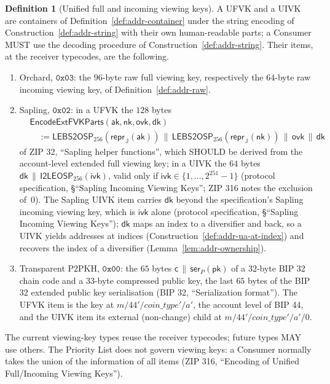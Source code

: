 \documentclass[11pt,a4paper]{article}
\theoremstyle{definition}
\newtheorem{definition}[theorem]{Definition}
\newcommand{\aksym}{\ensuremath{\mathsf{ak}}}
\newcommand{\nksym}{\ensuremath{\mathsf{nk}}}
\newcommand{\ivk}{\ensuremath{\mathsf{ivk}}}
\newcommand{\ovk}{\ensuremath{\mathsf{ovk}}}
\newcommand{\dk}{\ensuremath{\mathsf{dk}}}
\begin{document}
\begin{definition}[Unified full and incoming viewing keys]\label{def:addr-uvk}
A UFVK and a UIVK are containers of Definition~\ref{def:addr-container}
under the string encoding of Construction~\ref{def:addr-string} with their
own human-readable parts; a Consumer MUST use the decoding procedure of
Construction~\ref{def:addr-string}. Their items, at the receiver typecodes,
are the following.
\begin{enumerate}
\item Orchard, $\mathtt{0x03}$: the $96$-byte raw full viewing key,
  respectively the $64$-byte raw incoming viewing key, of
  Definition~\ref{def:addr-raw}.
\item Sapling, $\mathtt{0x02}$: in a UFVK the $128$ bytes
  \begin{align*}
    &\mathsf{EncodeExtFVKParts}(\aksym, \nksym, \ovk, \dk) \\
    &\quad := \mathsf{LEBS2OSP}_{256}(\mathsf{repr}_{\mathbb{J}}(\aksym))
    \,\|\, \mathsf{LEBS2OSP}_{256}(\mathsf{repr}_{\mathbb{J}}(\nksym))
    \,\|\, \ovk \,\|\, \dk
  \end{align*}
  of ZIP 32, ``Sapling helper functions'', which SHOULD be derived from the
  account-level extended full viewing key; in a UIVK the $64$ bytes
  $\dk \,\|\, \mathsf{I2LEOSP}_{256}(\ivk)$, valid only if
  $\ivk \in \{1, \dots, 2^{251} - 1\}$ (protocol specification,
  \S``Sapling Incoming Viewing Keys''; ZIP 316 notes the exclusion of~$0$).
  The Sapling UIVK item carries $\dk$ beyond the specification's Sapling
  incoming viewing key, which is $\ivk$ alone (protocol specification,
  \S``Sapling Incoming Viewing Keys''); $\dk$ maps an index to a diversifier
  and back, so a UIVK yields addresses at indices
  (Construction~\ref{def:addr-ua-at-index}) and recovers the index of a
  diversifier (Lemma~\ref{lem:addr-ownership}).
\item Transparent P2PKH, $\mathtt{0x00}$: the $65$ bytes
  $\mathsf{c} \,\|\, \mathsf{ser}_P(\mathsf{pk})$ of a $32$-byte BIP 32
  chain code and a $33$-byte compressed public key, the last $65$ bytes of
  the BIP 32 extended public key serialisation (BIP 32, ``Serialization
  format''). The UFVK item is the key at $m/44'/\mathit{coin\_type}'/a'$,
  the account level of BIP 44, and the UIVK item its external (non-change)
  child at $m/44'/\mathit{coin\_type}'/a'/0$.
\end{enumerate}
The current viewing-key types reuse the receiver typecodes; future types MAY
use others. The Priority List does not govern viewing keys: a Consumer
normally takes the union of the information of all items (ZIP 316,
``Encoding of Unified Full/Incoming Viewing Keys'').
\end{definition}
\end{document}
